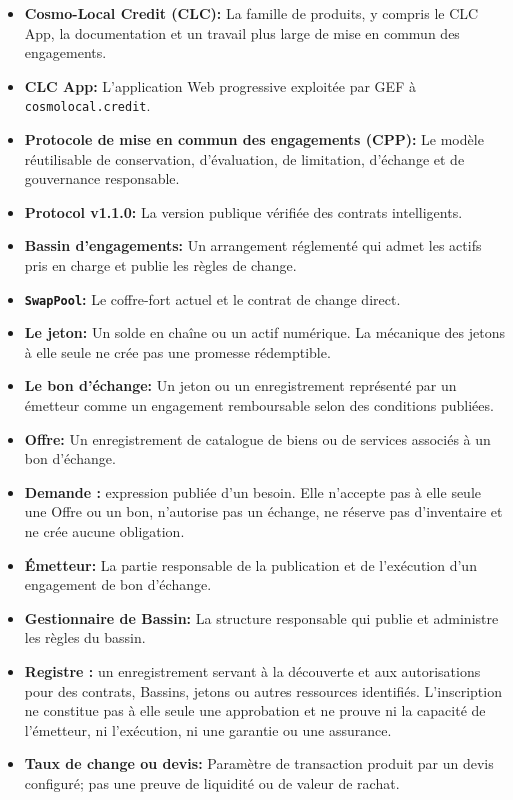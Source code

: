 \documentclass[11pt]{article}
\begin{document}
\begin{itemize}[leftmargin=*]
\item \textbf{Cosmo-Local Credit (CLC):} La famille de produits, y compris le CLC App, la documentation et un travail plus large de mise en commun des engagements.
\item \textbf{CLC App:} L'application Web progressive exploitée par GEF à \texttt{cosmolocal.credit}.
\item \textbf{Protocole de mise en commun des engagements (CPP):} Le modèle réutilisable de conservation, d'évaluation, de limitation, d'échange et de gouvernance responsable.
\item \textbf{Protocol v1.1.0:} La version publique vérifiée des contrats intelligents.
\item \textbf{Bassin d'engagements:} Un arrangement réglementé qui admet les actifs pris en charge et publie les règles de change.
\item \textbf{\texttt{SwapPool}:} Le coffre-fort actuel et le contrat de change direct.
\item \textbf{Le jeton:} Un solde en chaîne ou un actif numérique. La mécanique des jetons à elle seule ne crée pas une promesse rédemptible.
\item \textbf{Le bon d'échange:} Un jeton ou un enregistrement représenté par un émetteur comme un engagement remboursable selon des conditions publiées.
\item \textbf{Offre:} Un enregistrement de catalogue de biens ou de services associés à un bon d'échange.
\item \textbf{Demande :} expression publiée d'un besoin. Elle n'accepte pas à elle seule une Offre ou un bon, n'autorise pas un échange, ne réserve pas d'inventaire et ne crée aucune obligation.
\item \textbf{Émetteur:} La partie responsable de la publication et de l'exécution d'un engagement de bon d'échange.
\item \textbf{Gestionnaire de Bassin:} La structure responsable qui publie et administre les règles du bassin.
\item \textbf{Registre :} un enregistrement servant à la découverte et aux autorisations pour des contrats, Bassins, jetons ou autres ressources identifiés. L'inscription ne constitue pas à elle seule une approbation et ne prouve ni la capacité de l'émetteur, ni l'exécution, ni une garantie ou une assurance.
\item \textbf{Taux de change ou devis:} Paramètre de transaction produit par un devis configuré; pas une preuve de liquidité ou de valeur de rachat.

\end{itemize}
\end{document}
